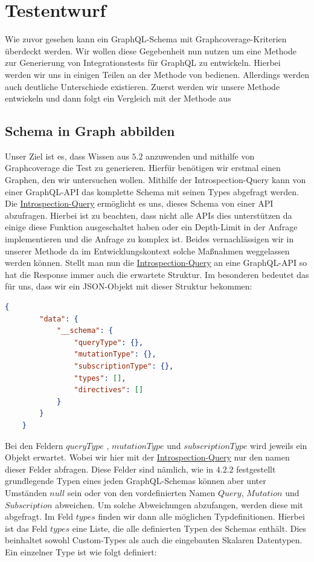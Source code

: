 \chapter{Testentwurf}
\label{testentwurf}

Wie zuvor gesehen kann ein GraphQL-Schema mit Graphcoverage-Kriterien überdeckt werden.
Wir wollen diese Gegebenheit nun nutzen um eine Methode zur Generierung von Integrationstests für GraphQL zu entwickeln.
Hierbei werden wir uns in einigen Teilen an der Methode von \cite[Property-based Testing of GraphQL-APIs]{property-based-testing} bedienen.
Allerdings werden auch deutliche Unterschiede existieren.
Zuerst werden wir unsere Methode entwickeln und dann folgt ein Vergleich mit der Methode aus \cite[Property-based Testing of GraphQL-APIs]{property-based-testing}

\section{Schema in Graph abbilden}

Unser Ziel ist es, dass Wissen aus $5.2$ anzuwenden und mithilfe von Graphcoverage die Test zu generieren.
Hierfür benötigen wir erstmal einen Graphen, den wir untersuchen wollen.
Mithilfe der Introspection-Query kann von einer GraphQL-API das komplette Schema mit seinen Types abgefragt werden.
Die \hyperref[introspection-query]{Introspection-Query} ermöglicht es uns, dieses Schema von einer API abzufragen.
Hierbei ist zu beachten, dass nicht alle APIs dies unterstützen da einige diese Funktion ausgeschaltet haben oder
ein Depth-Limit in der Anfrage implementieren und die Anfrage zu komplex ist.
Beides vernachlässigen wir in unserer Methode da im Entwicklungskontext solche Maßnahmen weggelassen werden können.
Stellt man nun die \hyperref[introspection-query]{Introspection-Query} an eine GraphQL-API so hat die Response immer auch
die erwartete Struktur.
Im besonderen bedeutet das für uns, dass wir ein JSON-Objekt mit dieser Struktur bekommen:

\begin{lstlisting}[language=json, caption={Schema-Response},captionpos=b]
    {
        "data": {
            "__schema": {
                "queryType": {},
                "mutationType": {},
                "subscriptionType": {},
                "types": [],
                "directives": []
            }
        }
    }
\end{lstlisting}

Bei den Feldern $queryType$ , $mutationType$ und $subscriptionType$ wird jeweils ein Objekt erwartet.
Wobei wir hier mit der \hyperref[introspection-query]{Introspection-Query} nur den namen dieser Felder abfragen.
Diese Felder sind nämlich, wie in $4.2.2$ festgestellt grundlegende Typen eines jeden GraphQL-Schemas
können aber unter Umständen $null$ sein oder von den vordefinierten Namen $Query$, $Mutation$ und $Subscription$ abweichen.
Um solche Abweichungen abzufangen, werden diese mit abgefragt.
Im Feld $types$ finden wir dann alle möglichen Typdefinitionen.
Hierbei ist das Feld $types$ eine Liste, die alle definierten Typen des Schemas enthält.
Dies beinhaltet sowohl Custom-Types als auch die eingebauten Skalaren Datentypen.
Ein einzelner Type ist wie folgt definiert:

